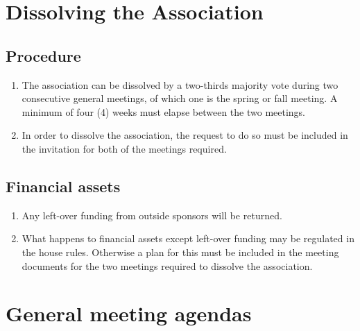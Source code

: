 \section*{Dissolving the Association}
\subsection{Procedure}
\begin{enumerate}
  \item The association can be dissolved by a two-thirds majority vote during two consecutive general meetings, of which one is the spring or fall meeting. A minimum of four (4) weeks must elapse between the two meetings.
  \item In order to dissolve the association, the request to do so must be included in the invitation for both of the meetings required.
\end{enumerate}

\subsection{Financial assets}
\begin{enumerate}
  \item Any left-over funding from outside sponsors will be returned.
  \item What happens to financial assets except left-over funding may be regulated in the house rules. Otherwise a plan for this must be included in the meeting documents for the two meetings required to dissolve the association.
\end{enumerate}

\cleardoublepage
\section*{General meeting agendas}

\clearpage

\cleardoublepage
